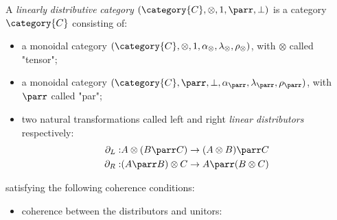 \documentclass[DIN, pagenumber=false, fontsize=11pt, parskip=half, colorinlistoftodos, svgnames]{scrartcl}
\begin{document}
	\begin{definition}
		\label{def: linDisCat}
		A \emph{linearly} \emph{distributive} \emph{category} $(\category{C}, \otimes, 1, \parr, \bot)$ is a category $\category{C}$ consisting of:
		\begin{itemize}
			\item a monoidal category $(\category{C}, \otimes, 1, \alpha_\otimes, \lambda_\otimes, \rho_\otimes)$, with $\otimes$ called "tensor";
			\item a monoidal  category $(\category{C}, \parr, \bot, \alpha_\parr, \lambda_\parr, \rho_\parr)$, with $\parr$ called "par";
			\item two natural transformations called left and right \emph{linear distributors} respectively:
			\begin{align*}
				\partial_L:& A \otimes (B \parr C) \rightarrow (A\otimes B) \parr C
				\\
				\partial_R:& (A \parr B) \otimes C \rightarrow A \parr (B \otimes C)
			\end{align*}
		\end{itemize}
		satisfying the following coherence conditions:
		\begin{itemize}
			\item 
				coherence between the distributors and unitors:
				\begin{center}
					

\end{center}
\end{itemize}
\end{definition}
\end{document}
